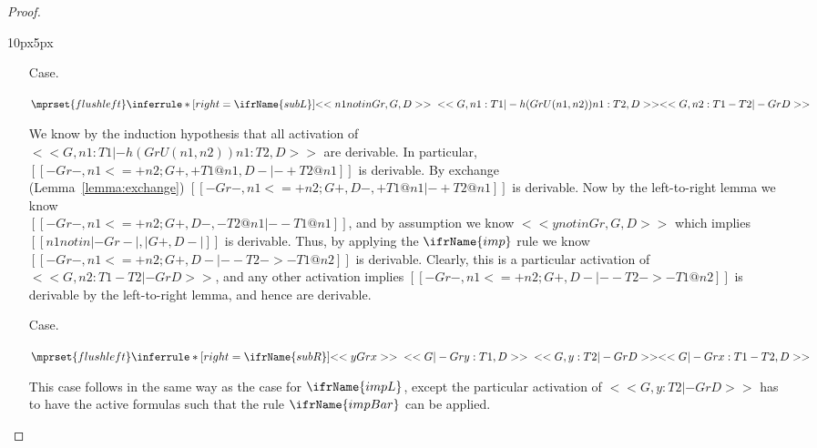 \begin{proof}
\begin{changemargin}{10px}{5px}
\begin{itemize}
  \item[Case.]\ \\ 
    \begin{center}
      \begin{math}
        $$\mprset{flushleft}
        \inferrule* [right=\ifrName{subL}] {
          <<n1 notin Gr, G, D>>
          \\\\
          <<G, n1 : T1 |- h(Gr U {(n1,n2)}) n1 : T2, D>>
        }{<<G, n2 : T1 - T2 |- Gr D>>}
      \end{math}
    \end{center}
    We know by the induction hypothesis
    that all activation of \\ $<<G, n1 : T1 |- h(Gr U {(n1,n2)}) n1 : T2, D>>$ are derivable.  In particular,
    $[[-Gr-,n1 <=+ n2 ; {G}+, +{T1}@n1,{D}- |- +{T2}@n1]]$ is
    derivable.  By exchange \\ (Lemma~\ref{lemma:exchange})
    $[[-Gr-,n1 <=+ n2 ; {G}+, {D}-,+{T1}@n1 |- +{T2}@n1]]$ is derivable.  Now by the left-to-right lemma we know \\
    $[[-Gr-,n1 <=+ n2 ; {G}+, {D}-,-{T2}@n1 |- -{T1}@n1]]$, and by
    assumption we know $<<y notin Gr, G, D>>$ which implies 
    $[[n1 notin |-Gr-|,|{G}+,{D}-|]]$ is derivable.  Thus, by applying the $\ifrName{\normalsize imp}$ rule we know  
    $[[-Gr-,n1 <=+ n2 ; {G}+, {D}- |- - {T2} ->- {T1}@n2]]$ is derivable.  Clearly, this is a particular activation of
    $<<G, n2 : T1 - T2 |- Gr D>>$, and any other activation implies
    $[[-Gr-,n1 <=+ n2 ; {G}+, {D}- |- - {T2} ->- {T1}@n2]]$ is derivable by the left-to-right lemma, and hence are derivable.

  \item[Case.]\ \\ 
    \begin{center}
      \begin{math}
        $$\mprset{flushleft}
        \inferrule* [right=\ifrName{subR}] {
          <<y Gr x>>
          \\\\
          <<G |- Gr y : T1 , D>>
          \\\\
          <<G, y : T2 |- Gr D>>
        }{<<G |- Gr x : T1 - T2, D>>}
      \end{math}
    \end{center}
    This case follows in the same way as the case for $\ifrName{\normalsize impL}$,
    except the particular activation of $<<G, y : T2 |- Gr D>>$ has to have the active formulas such that the
    rule $\ifrName{\normalsize impBar}$ can be applied.
  \end{itemize}
  \end{changemargin}
\end{proof}

